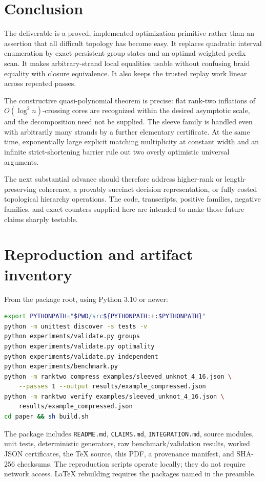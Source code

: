 \documentclass[11pt]{article}
\theoremstyle{definition}
\theoremstyle{remark}
\begin{document}
\section{Conclusion}
The deliverable is a proved, implemented optimization primitive rather than
an assertion that all difficult topology has become easy. It replaces
quadratic interval enumeration by exact persistent group states and an
optimal weighted prefix scan. It makes arbitrary-strand local equalities
usable without confusing braid equality with closure equivalence. It also
keeps the trusted replay work linear across repeated passes.

The constructive quasi-polynomial theorem is precise: flat rank-two
inflations of $O(\log^2 n)$-crossing cores are recognized within the desired
asymptotic scale, and the decomposition need not be supplied. The sleeve
family is handled even with arbitrarily many strands by a further elementary
certificate. At the same time, exponentially large explicit matching
multiplicity at constant width and an infinite strict-shortening barrier
rule out two overly optimistic universal arguments.

The next substantial advance should therefore address higher-rank or
length-preserving coherence, a provably succinct decision representation,
or fully costed topological hierarchy operations. The code, transcripts,
positive families, negative families, and exact counters supplied here are
intended to make those future claims sharply testable.

\clearpage
\appendix
\section{Reproduction and artifact inventory}
From the package root, using Python 3.10 or newer:
\begin{lstlisting}[language=bash]
export PYTHONPATH="$PWD/src${PYTHONPATH:+:$PYTHONPATH}"
python -m unittest discover -s tests -v
python experiments/validate.py groups
python experiments/validate.py optimality
python experiments/validate.py independent
python experiments/benchmark.py
python -m ranktwo compress examples/sleeved_unknot_4_16.json \
    --passes 1 --output results/example_compressed.json
python -m ranktwo verify examples/sleeved_unknot_4_16.json \
    results/example_compressed.json
cd paper && sh build.sh
\end{lstlisting}
The package includes \texttt{README.md}, \texttt{CLAIMS.md},
\texttt{INTEGRATION.md}, source modules, unit tests, deterministic generators,
raw benchmark/validation results, worked JSON certificates, the TeX source,
this PDF, a provenance manifest, and SHA-256 checksums. The reproduction
scripts operate locally; they do not require network access. LaTeX rebuilding
requires the packages named in the preamble.
\end{document}

